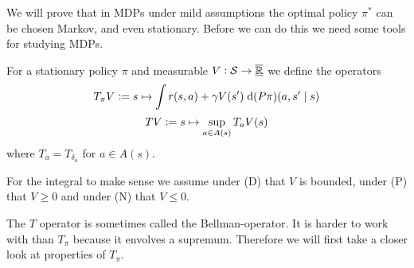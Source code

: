 We will prove that in MDPs under mild assumptions the optimal policy $\pi^*$
can be chosen Markov, and even stationary. Before we can do this
we need some tools for studying MDPs.

\begin{defn}
  For a stationary policy $\pi$ and measurable $V:\mathcal{S} \to \overline{\underline{\mathbb{R}}}$
  we define the operators 
  \[ T_\pi V \vcentcolon= s \mapsto \int r(s, a)
  + \gamma V(s') \; \mathrm{d} (P \pi)(a, s'\mid s) \]
  \[ T V \vcentcolon= s \mapsto \sup_{a \in A(s)} T_a V(s) \]
  where $T_a = T_{\delta_a}$ for $a \in A(s)$.
\end{defn}
\begin{rem}
  For the integral to make sense we assume under (D) that $V$ is bounded,
  under (P) that $V\geq 0$ and under (N) that $V \leq 0$.
\end{rem}

The $T$ operator is sometimes called the Bellman-operator. %
It is harder to work with than $T_\pi$ because it envolves a supremum.
Therefore we will first take a closer look at properties of $T_\pi$.

